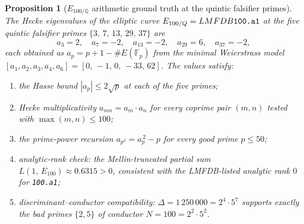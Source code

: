 \documentclass{article}
\newtheorem{proposition}{Proposition}
\begin{document}
\begin{proposition}[$E_{100/\mathbb{Q}}$ arithmetic ground truth at the
quintic falsifier primes]
\label{prop:E100-arithmetic-ground-truth}
The Hecke eigenvalues of the elliptic curve $E_{100/\mathbb{Q}} =
\textup{LMFDB } \texttt{100.a1}$ at the five quintic falsifier primes
$\{3,\, 7,\, 13,\, 29,\, 37\}$ are
\[
  a_3 = 2,\quad a_7 = -2,\quad a_{13} = -2,\quad a_{29} = 6,\quad a_{37} = -2,
\]
each obtained as $a_p = p + 1 - \#E(\mathbb{F}_p)$ from the minimal
Weierstrass model $[a_1, a_2, a_3, a_4, a_6] = [0,\, -1,\, 0,\, -33,\, 62]$.
The values satisfy:
\begin{enumerate}[label=\textup{(\roman*)}]
\item the Hasse bound $|a_p| \leq 2\sqrt{p}$ at each of the five primes;
\item Hecke multiplicativity $a_{mn} = a_m \cdot a_n$ for every coprime
      pair $(m, n)$ tested with $\max(m, n) \leq 100$;
\item the prime-power recursion $a_{p^2} = a_p^{\,2} - p$ for every good
      prime $p \leq 50$;
\item analytic-rank check: the Mellin-truncated partial sum
      $L(1,\, E_{100}) \approx 0.6315 > 0$, consistent with the
      LMFDB-listed analytic rank $0$ for \texttt{100.a1};
\item discriminant--conductor compatibility: $\Delta = 1\,250\,000 =
      2^4 \cdot 5^7$ supports exactly the bad primes $\{2, 5\}$ of
      conductor $N = 100 = 2^2 \cdot 5^2$.
\end{enumerate}
\end{proposition}
\end{document}
